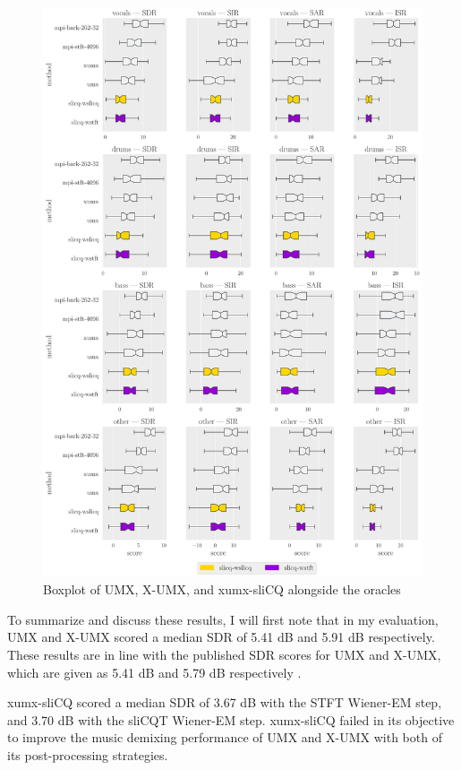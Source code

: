 \documentclass[report.tex]{subfiles}
\begin{document}
\begin{figure}[ht]
	\centering
	\includegraphics[width=\textwidth]{./images-bss/boxplot_full.pdf}
	\caption{Boxplot of UMX, X-UMX, and xumx-sliCQ alongside the oracles}
	\label{fig:bssboxplot}
\end{figure}

To summarize and discuss these results, I will first note that in my evaluation, UMX and X-UMX scored a median SDR of 5.41 dB and 5.91 dB respectively. These results are in line with the published SDR scores for UMX and X-UMX, which are given as 5.41 dB and 5.79 dB respectively \parencite[4]{xumx}.

xumx-sliCQ scored a median SDR of 3.67 dB with the STFT Wiener-EM step, and 3.70 dB with the sliCQT Wiener-EM step. xumx-sliCQ failed in its objective to improve the music demixing performance of UMX and X-UMX with both of its post-processing strategies.
\end{document}
